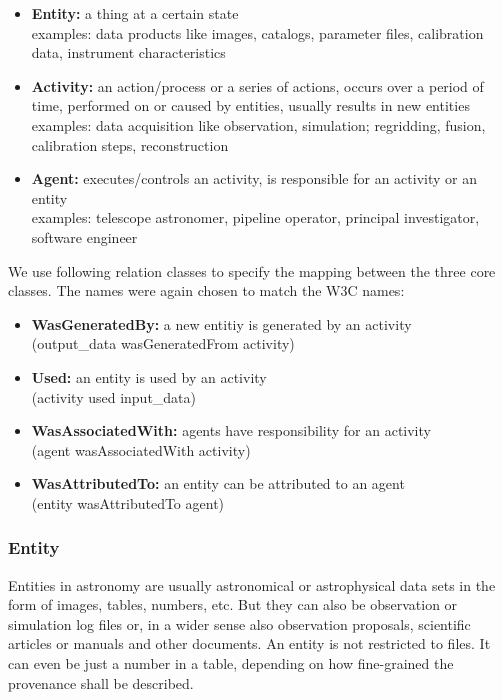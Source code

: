 \begin{itemize}
\item \textbf{Entity:} a thing at a certain state\\
    examples: data products like images, catalogs, parameter files, calibration data, instrument characteristics

\item \textbf{Activity:} an action/process or a series of actions, occurs over a period of time, performed on or caused by entities, usually results in new entities\\
    examples: data acquisition like observation, simulation; regridding, fusion, calibration steps, reconstruction

\item \textbf{Agent:} executes/controls an activity, is responsible for an activity or an entity\\
    examples: telescope astronomer, pipeline operator, principal investigator, software engineer

\end{itemize}

\noindent

We use following relation classes to specify the mapping between the three core 
classes. The names were again chosen to match the W3C names:
\begin{itemize}
\item \textbf{WasGeneratedBy:} a new entitiy is generated by an activity\\
        (output\_data wasGeneratedFrom activity)
\item \textbf{Used:} an entity is used by an activity\\
        (activity used input\_data)
\item \textbf{WasAssociatedWith:} agents have responsibility for an activity\\
        (agent wasAssociatedWith activity)
\item \textbf{WasAttributedTo:} an entity can be attributed to an agent\\
		(entity wasAttributedTo agent)
\end{itemize}


\subsubsection{Entity}
Entities in astronomy are usually astronomical or astrophysical data sets in the form of images, tables, numbers, etc. But they can also be observation or simulation log files or, in a wider sense also observation proposals, scientific articles or manuals and other documents. An entity is not restricted to files. It can even be just a number in a table, depending on how fine-grained the provenance shall be described.

